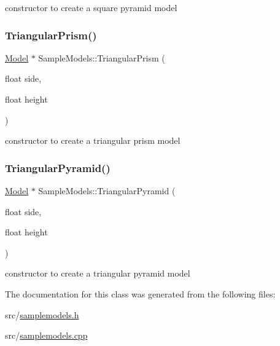 constructor to create a square pyramid model 

\mbox{\label{class_sample_models_ad9be52995d798b78ad2c04c1b3c1f4e4}} 
\subsubsection{\texorpdfstring{Triangular\+Prism()}{TriangularPrism()}}
{\footnotesize\ttfamily \mbox{\hyperlink{class_model}{Model}} $\ast$ Sample\+Models\+::\+Triangular\+Prism (\begin{DoxyParamCaption}\item[{float}]{side,  }\item[{float}]{height }\end{DoxyParamCaption})\hspace{0.3cm}{\ttfamily [static]}}



constructor to create a triangular prism model 

\mbox{\label{class_sample_models_ac979fefcbc81571af56a2cf3c415497b}} 
\subsubsection{\texorpdfstring{Triangular\+Pyramid()}{TriangularPyramid()}}
{\footnotesize\ttfamily \mbox{\hyperlink{class_model}{Model}} $\ast$ Sample\+Models\+::\+Triangular\+Pyramid (\begin{DoxyParamCaption}\item[{float}]{side,  }\item[{float}]{height }\end{DoxyParamCaption})\hspace{0.3cm}{\ttfamily [static]}}



constructor to create a triangular pyramid model 



The documentation for this class was generated from the following files\+:\begin{DoxyCompactItemize}
\item 
src/\mbox{\hyperlink{samplemodels_8h}{samplemodels.\+h}}\item 
src/\mbox{\hyperlink{samplemodels_8cpp}{samplemodels.\+cpp}}\end{DoxyCompactItemize}
